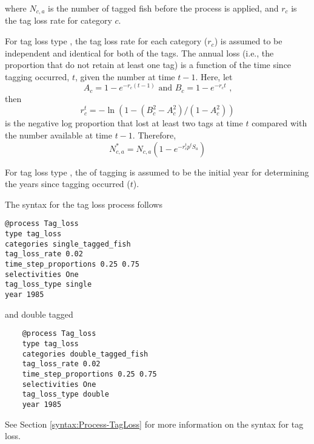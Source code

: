 where $N_{c,a}$ is the number of tagged fish before the process is applied, and $r_c$ is the tag loss rate for category $c$.

For tag loss type , the tag loss rate  for each category ($r_c$) is assumed to be independent and identical for both of the tags. The annual loss (i.e., the proportion that do not retain at least one tag) is a function of the time since tagging occurred, $t$, given the number at time $t-1$. Here, let
\begin{equation}
	A_c = 1-e^{-r_c (t-1)} \text{\ and\ }
	B_c = 1-e^{-r_c t} \text{\ ,} 
\end{equation}
then 
\begin{equation}
	r^t_c = -\ln(1 - (B^2_c - A^2_c) / (1-A^2_c))
\end{equation}
is the negative log proportion that lost at least two tags at time $t$ compared with the number available at time $t-1$. Therefore, 
\begin{equation}
	N^*_{c,a} = N_{c,a} (1-e^{-r^t_c p^t S_a})
\end{equation}

For tag loss type , the  of tagging is assumed to be the initial year for determining the years since tagging occurred ($t$).

The syntax for the tag loss process follows

{\small{\begin{verbatim}
@process Tag_loss
type tag_loss
categories single_tagged_fish
tag_loss_rate 0.02
time_step_proportions 0.25 0.75
selectivities One
tag_loss_type single
year 1985
\end{verbatim}}}

and double tagged

{\small{\begin{verbatim}
	@process Tag_loss
	type tag_loss
	categories double_tagged_fish
	tag_loss_rate 0.02
	time_step_proportions 0.25 0.75
	selectivities One
	tag_loss_type double
	year 1985
\end{verbatim}}}

See Section \ref{syntax:Process-TagLoss} for more information on the syntax for tag loss.

\subsubsection{}\label{sec:Process-TagLossEmpirical} 

